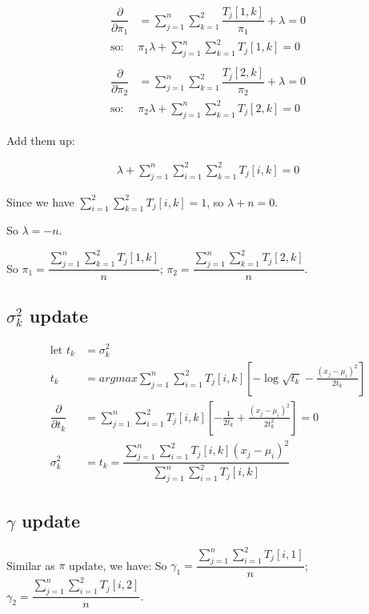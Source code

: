 \documentclass{amsart}
\begin{document}
\begin{align*}
	\dfrac{\partial}{\partial \pi_1} &= \sum\limits_{j=1}^{n} \sum\limits_{k=1}^{2}\dfrac{T_j[1,k]}{\pi_1} + \lambda = 0\\
	\text{so: }&{\pi_1} \lambda + \sum\limits_{j=1}^{n} \sum\limits_{k=1}^{2}T_j[1,k] = 0\\\\
	\dfrac{\partial}{\partial \pi_2} &= \sum\limits_{j=1}^{n} \sum\limits_{k=1}^{2}\dfrac{T_j[2,k]}{\pi_2} + \lambda = 0\\
	\text{so: }&{\pi_2} \lambda + \sum\limits_{j=1}^{n} \sum\limits_{k=1}^{2}T_j[2,k] = 0
\end{align*}

Add them up:

\begin{align*}
\lambda + \sum\limits_{j=1}^{n} \sum\limits_{i=1}^{2} \sum\limits_{k=1}^{2}T_j[i,k] = 0
\end{align*}

Since we have $\sum\limits_{i=1}^{2} \sum\limits_{k=1}^{2}T_j[i,k] = 1$, so $\lambda + n = 0$.

So $\lambda = -n$.

So $\pi_1 = \dfrac{\sum\limits_{j=1}^{n}\sum\limits_{k=1}^{2}T_j[1,k]}{n}$; $\pi_2 = \dfrac{\sum\limits_{j=1}^{n}\sum\limits_{k=1}^{2}T_j[2,k]}{n}$.

\subsection*{$\sigma^2_k$ update}

\begin{align*}
\text{let }t_k &= \sigma^2_k\\
t_k &= argmax \sum\limits_{j=1}^{n}\sum\limits_{i=1}^{2} T_j[i,k]\left[ -\log\sqrt{t_k} -\frac{(x_j-\mu_i)^2}{2t_k}\right]\\
\dfrac{\partial}{\partial t_k} &= \sum\limits_{j=1}^{n}\sum\limits_{i=1}^{2} T_j[i,k]\left[ -\frac{1}{2t_k} +\frac{(x_j-\mu_i)^2}{2t_k^2}\right] = 0\\
\sigma_k^2 &= t_k = \dfrac{\sum\limits_{j=1}^{n}\sum\limits_{i=1}^{2}T_j[i,k](x_j-\mu_i)^2}{\sum\limits_{j=1}^{n}\sum\limits_{i=1}^{2}T_j[i,k]}
\end{align*}

\subsection*{$\gamma$ update} Similar as $\pi$ update, we have:
So $\gamma_1 = \dfrac{\sum\limits_{j=1}^{n}\sum\limits_{i=1}^{2}T_j[i,1]}{n}$; $\gamma_2 = \dfrac{\sum\limits_{j=1}^{n}\sum\limits_{i=1}^{2}T_j[i,2]}{n}$.
\end{document}
